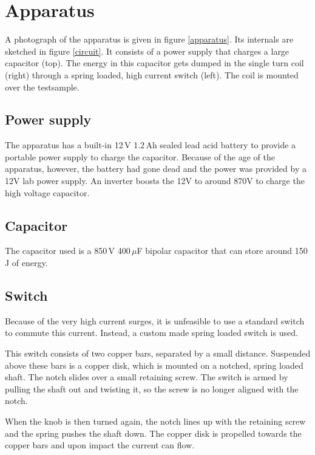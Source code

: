 \section{Apparatus}


A photograph of the apparatus is given in figure \ref{apparatus}. Its 
internals are sketched in figure \ref{circuit}. It consists of a power 
supply that charges a large capacitor (top).  The energy in this capacitor 
gets dumped in the single turn coil (right) through a spring loaded, high 
current switch (left). The coil is mounted over the testsample.



\subsection{Power supply}
The apparatus has a built-in 12\,V 1.2\,Ah sealed lead acid battery to provide 
a portable power supply to charge the capacitor. Because of the age of the 
apparatus, however, the battery had gone dead and the power was provided by a 
12V lab power supply. An inverter boosts the 12V to around 870V to charge the 
high voltage capacitor.


\subsection{Capacitor}
The capacitor used is a 850\,V 400\,$\mu$F bipolar capacitor that can store 
around 150\,J of energy.


\subsection{Switch}
Because of the very high current surges, it is unfeasible to use a standard 
switch to commute this current. Instead, a custom made spring loaded switch is 
used.

This switch consists of two copper bars, separated by a small distance.  
Suspended above these bars is a copper disk, which is mounted on a notched, 
spring loaded shaft. The notch slides over a small retaining screw.  The switch 
is armed by pulling the shaft out and twisting it, so the screw is no longer 
aligned with the notch.

When the knob is then turned again, the notch lines up with the retaining 
screw and the spring pushes the shaft down. The copper disk is propelled 
towards the copper bars and upon impact the current can flow.

